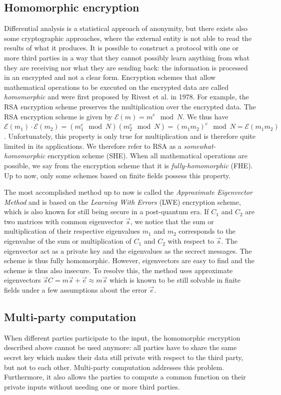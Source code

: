 \subsection{Homomorphic encryption}
Differential analysis is a statistical approach of anonymity, but there exists also some cryptographic approaches, where the external entity is not able to read the results of what it produces. It is possible to construct a protocol with one or more third parties in a way that they cannot possibly learn anything from what they are receiving nor what they are sending back: the information is processed in an encrypted and not a clear form. Encryption schemes that allow mathematical operations to be executed on the encrypted data are called \emph{homomorphic} and were first proposed by Rivest et al. in 1978. For example, the RSA encryption scheme preserves the multiplication over the encrypted data. The RSA encryption scheme is given by $\mathscr{E}(m)=m^e \mod N$. We thus have $\mathscr{E}(m_1) \cdot  \mathscr{E}(m_2) = \left(m_1^e \mod N \right)\left(m_2^e \mod N \right) = \left(m_1m_2\right)^e \mod N = \mathscr{E}(m_1m_2)$. Unfortunately, this property is only true for multiplication and is therefore quite limited in its applications. We therefore refer to RSA as a \emph{somewhat-homomorphic} encryption scheme (SHE). When all mathematical operations are possible, we say from the encryption scheme that it is \emph{fully-homomorphic} (FHE). Up to now, only some schemes based on finite fields possess this property. 

The most accomplished method up to now is called the \emph{Approximate Eigenvector Method} and is based on the \emph{Learning With Errors} (LWE) encryption scheme, which is also known for still being secure in a post-quantum era. If $C_1$ and $C_2$ are two matrices with common eigenvector $\vec{s}$, we notice that the sum or multiplication of their respective eigenvalues $m_1$ and $m_2$ corresponds to the eigenvalue of the sum or multiplication of $C_1$ and $C_2$ with respect to $\vec{s}$. The eigenvector act as a private key and the eigenvalues as the secrect messages. The scheme is thus fully homomorphic. However, eigenvectors are easy to find and the scheme is thus also insecure. To resolve this, the method uses approximate eigenvectors $\vec{s}C=m\vec{s}+\vec{e}\approx m\vec{s}$ which is known to be still solvable in finite fields under a few assumptions about the error $\vec{e}$.

\subsection{Multi-party computation}
When different parties participate to the input, the homomorphic encryption described above cannot be used anymore: all parties have to share the same secret key which makes their data still private with respect to the third party, but not to each other. Multi-party computation addresses this problem. Furthermore, it also allows the parties to compute a common function on their private inputs without needing one or more third parties. 

